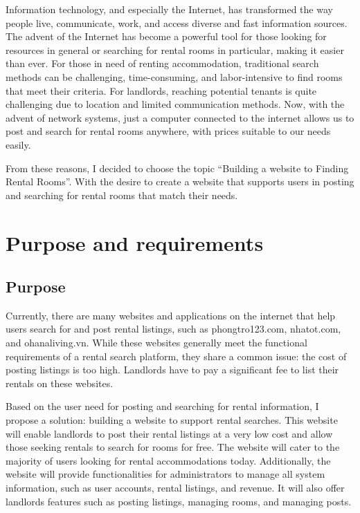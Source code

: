 \documentclass[../Main.tex]{subfiles}
\begin{document}
Information technology, and especially the Internet, has transformed the way people live, communicate, work, and access diverse and fast information sources.
The advent of the Internet has become a powerful tool for those looking for resources in general or searching for rental rooms in particular, making it easier than ever.
For those in need of renting accommodation, traditional search methods can be challenging, time-consuming, and labor-intensive to find rooms that meet their criteria.
For landlords, reaching potential tenants is quite challenging due to location and limited communication methods.
Now, with the advent of network systems, just a computer connected to the internet allows us to post and search for rental rooms anywhere, with prices suitable to our needs easily.

From these reasons, I decided to choose the topic ``Building a website to Finding Rental Rooms''.
With the desire to create a website that supports users in posting and searching for rental rooms that match their needs.

\section{Purpose and requirements}
\label{sec:purpose}

\subsection{Purpose}

Currently, there are many websites and applications on the internet that help users search for and post rental listings, such as phongtro123.com, nhatot.com, and ohanaliving.vn.
While these websites generally meet the functional requirements of a rental search platform, they share a common issue: the cost of posting listings is too high.
Landlords have to pay a significant fee to list their rentals on these websites.

Based on the user need for posting and searching for rental information, I propose a solution: building a website to support rental searches.
This website will enable landlords to post their rental listings at a very low cost and allow those seeking rentals to search for rooms for free.
The website will cater to the majority of users looking for rental accommodations today.
Additionally, the website will provide functionalities for administrators to manage all system information, such as user accounts, rental listings, and revenue.
It will also offer landlords features such as posting listings, managing rooms, and managing posts.
\end{document}
